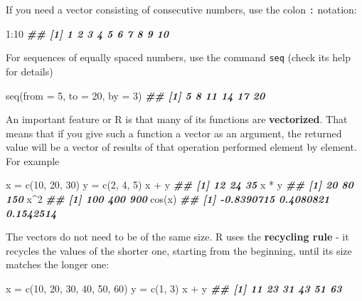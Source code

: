 \documentclass[
]{book}
\newenvironment{Shaded}{\begin{snugshade}}{\end{snugshade}}
\newcommand{\AttributeTok}[1]{\textcolor[rgb]{0.77,0.63,0.00}{#1}}
\newcommand{\DecValTok}[1]{\textcolor[rgb]{0.00,0.00,0.81}{#1}}
\newcommand{\DocumentationTok}[1]{\textcolor[rgb]{0.56,0.35,0.01}{\textbf{\textit{#1}}}}
\newcommand{\FunctionTok}[1]{\textcolor[rgb]{0.00,0.00,0.00}{#1}}
\newcommand{\NormalTok}[1]{#1}
\newcommand{\OtherTok}[1]{\textcolor[rgb]{0.56,0.35,0.01}{#1}}
\newcommand{\SpecialCharTok}[1]{\textcolor[rgb]{0.00,0.00,0.00}{#1}}
\theoremstyle{definition}
\theoremstyle{definition}
\theoremstyle{definition}
\theoremstyle{definition}
\theoremstyle{remark}
\begin{document}
If you need a vector consisting of consecutive numbers, use the colon \texttt{:} notation:

\begin{Shaded}
\begin{Highlighting}[]
\DecValTok{1}\SpecialCharTok{:}\DecValTok{10}
\DocumentationTok{\#\#  [1]  1  2  3  4  5  6  7  8  9 10}
\end{Highlighting}
\end{Shaded}

For sequences of equally spaced numbers, use the command \texttt{seq} (check its help for details)

\begin{Shaded}
\begin{Highlighting}[]
\FunctionTok{seq}\NormalTok{(}\AttributeTok{from =} \DecValTok{5}\NormalTok{, }\AttributeTok{to =} \DecValTok{20}\NormalTok{, }\AttributeTok{by =} \DecValTok{3}\NormalTok{)}
\DocumentationTok{\#\# [1]  5  8 11 14 17 20}
\end{Highlighting}
\end{Shaded}

An important feature or R is that many of its functions are \textbf{vectorized}. That means that if you give such a function a vector as an argument, the returned value will be a vector of results of that operation performed element by element. For example

\begin{Shaded}
\begin{Highlighting}[]
\NormalTok{x }\OtherTok{=} \FunctionTok{c}\NormalTok{(}\DecValTok{10}\NormalTok{, }\DecValTok{20}\NormalTok{, }\DecValTok{30}\NormalTok{)}
\NormalTok{y }\OtherTok{=} \FunctionTok{c}\NormalTok{(}\DecValTok{2}\NormalTok{, }\DecValTok{4}\NormalTok{, }\DecValTok{5}\NormalTok{)}
\NormalTok{x }\SpecialCharTok{+}\NormalTok{ y}
\DocumentationTok{\#\# [1] 12 24 35}
\NormalTok{x }\SpecialCharTok{*}\NormalTok{ y}
\DocumentationTok{\#\# [1]  20  80 150}
\NormalTok{x}\SpecialCharTok{\^{}}\DecValTok{2}
\DocumentationTok{\#\# [1] 100 400 900}
\FunctionTok{cos}\NormalTok{(x)}
\DocumentationTok{\#\# [1] {-}0.8390715  0.4080821  0.1542514}
\end{Highlighting}
\end{Shaded}

The vectors do not need to be of the same size. R uses the \textbf{recycling rule} -
it recycles the values of the shorter one, starting from the beginning, until
its size matches the longer one:

\begin{Shaded}
\begin{Highlighting}[]
\NormalTok{x }\OtherTok{=} \FunctionTok{c}\NormalTok{(}\DecValTok{10}\NormalTok{, }\DecValTok{20}\NormalTok{, }\DecValTok{30}\NormalTok{, }\DecValTok{40}\NormalTok{, }\DecValTok{50}\NormalTok{, }\DecValTok{60}\NormalTok{)}
\NormalTok{y }\OtherTok{=} \FunctionTok{c}\NormalTok{(}\DecValTok{1}\NormalTok{, }\DecValTok{3}\NormalTok{)}
\NormalTok{x }\SpecialCharTok{+}\NormalTok{ y}
\DocumentationTok{\#\# [1] 11 23 31 43 51 63}
\end{Highlighting}
\end{Shaded}
\end{document}
